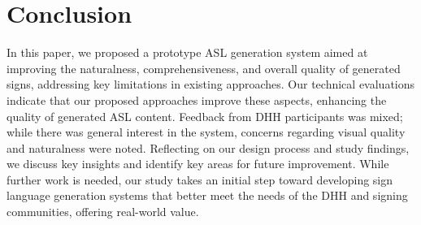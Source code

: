 \section{Conclusion}\label{sec:conclusion}

In this paper, we proposed a prototype ASL generation system aimed at improving the naturalness, comprehensiveness, and overall quality of generated signs, addressing key limitations in existing approaches. Our technical evaluations indicate that our proposed approaches improve these aspects, enhancing the quality of generated ASL content. Feedback from DHH participants was mixed; while there was general interest in the system, concerns regarding visual quality and naturalness were noted. Reflecting on our design process and study findings, we discuss key insights and identify key areas for future improvement. While further work is needed, our study takes an initial step toward developing sign language generation systems that better meet the needs of the DHH and signing communities, offering real-world value.